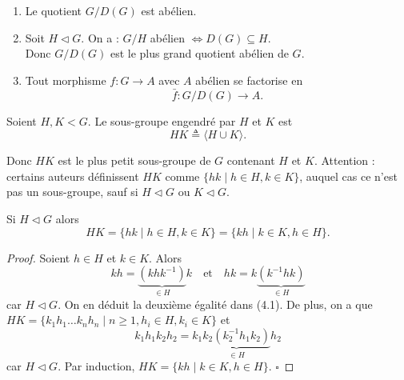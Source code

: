 \begin{proposition}
        \begin{enumerate}
    \item Le quotient \( G/D(G) \) est abélien.
    \item Soit \( H \triangleleft G \). On a : \( G/H \) abélien \( \Leftrightarrow D(G) \subseteq H \).\\
    Donc \( G/D(G) \) est le plus grand quotient abélien de \( G \).
    \item Tout morphisme \( f: G \to A \) avec \( A \) abélien se factorise en 
    \[
    \bar{f} : G/D(G) \longrightarrow A.
    \]
\end{enumerate}
    \end{proposition}
\begin{definition}
        Soient \( H, K < G \). Le sous-groupe engendré par \( H \) et \( K \) est
\[
HK \triangleq \langle H \cup K \rangle.
\]
    \end{definition}

Donc \( HK \) est le plus petit sous-groupe de \( G \) contenant \( H \) et \( K \).  
Attention : certains auteurs définissent \( HK \) comme \( \{ hk \mid h \in H, k \in K \} \),  
auquel cas ce n’est pas un sous-groupe, sauf si \( H \triangleleft G \) ou \( K \triangleleft G \).

\begin{center}
\end{center}

\begin{lemme}
        Si \( H \triangleleft G \) alors
\[
HK = \{ hk \mid h \in H, k \in K \} = \{ kh \mid k \in K, h \in H \}.
\]
    \end{lemme}

\begin{proof}
    Soient \( h \in H \) et \( k \in K \). Alors  
\[
kh = \underbrace{(khk^{-1})}_{\in H} k \quad \text{et} \quad hk = k \underbrace{(k^{-1}hk)}_{\in H}
\]
car \( H \triangleleft G \). On en déduit la deuxième égalité dans (4.1).  
De plus, on a que \( HK = \{ k_1h_1 \dots k_nh_n \mid n \geq 1, h_i \in H, k_i \in K \} \) et  
\[
k_1h_1k_2h_2 = k_1 \underbrace{k_2 (k_2^{-1}h_1k_2)}_{\in H} h_2
\]
car \( H \triangleleft G \). Par induction, \( HK = \{ kh \mid k \in K, h \in H \} \). \(\square\)

\end{proof}

